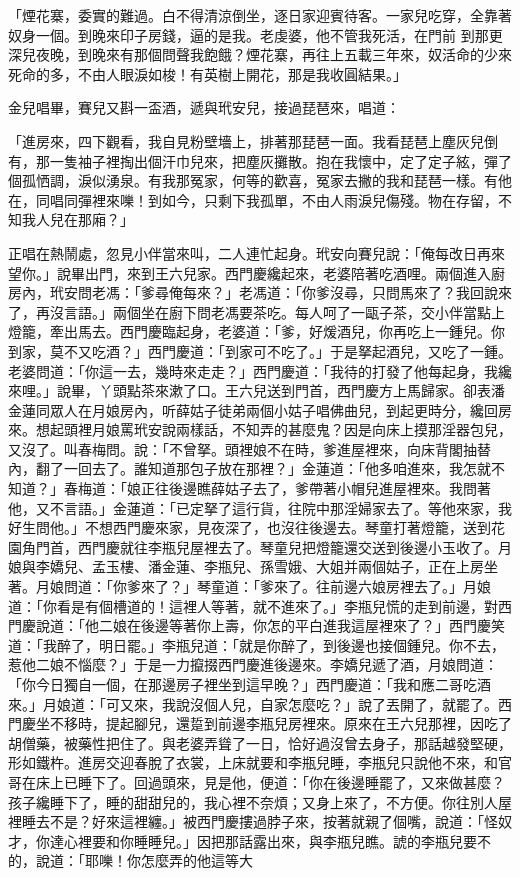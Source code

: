 \begin{showcontents}{}
「煙花寨，委實的難過。白不得清涼倒坐，逐日家迎賓待客。一家兒吃穿，全靠著奴身一個。到晚來印子房錢，逼的是我。老虔婆，他不管我死活，在門前 到那更深兒夜晚，到晚來有那個問聲我飽餓？煙花寨，再往上五載三年來，奴活命的少來死命的多，不由人眼淚如梭！有英樹上開花，那是我收圓結果。」

金兒唱畢，賽兒又斟一盃酒，遞與玳安兒，接過琵琶來，唱道：

「進房來，四下觀看，我自見粉壁墻上，排著那琵琶一面。我看琵琶上塵灰兒倒有，那一隻袖子裡掏出個汗巾兒來，把塵灰攤散。抱在我懷中，定了定子絃，彈了個孤恓調，淚似湧泉。有我那冤家，何等的歡喜，冤家去撇的我和琵琶一樣。有他在，同唱同彈裡來嚛！到如今，只剩下我孤單，不由人雨淚兒傷殘。物在存留，不知我人兒在那廂？」

正唱在熱鬧處，忽見小伴當來叫，二人連忙起身。玳安向賽兒說：「俺每改日再來望你。」說畢出門，來到王六兒家。西門慶纔起來，老婆陪著吃酒哩。兩個進入廚房內，玳安問老馮：「爹尋俺每來？」老馮道：「你爹沒尋，只問馬來了？我回說來了，再沒言語。」兩個坐在廚下問老馮要茶吃。每人呵了一甌子茶，交小伴當點上燈籠，牽出馬去。西門慶臨起身，老婆道：「爹，好煖酒兒，你再吃上一鍾兒。你到家，莫不又吃酒？」西門慶道：「到家可不吃了。」于是拏起酒兒，又吃了一鍾。老婆問道：「你這一去，幾時來走走？」西門慶道：「我待的打發了他每起身，我纔來哩。」說畢，丫頭點茶來漱了口。王六兒送到門首，西門慶方上馬歸家。卻表潘金蓮同眾人在月娘房內，听薛姑子徒弟兩個小姑子唱佛曲兒，到起更時分，纔回房來。想起頭裡月娘罵玳安說兩樣話，不知弄的甚麼鬼？因是向床上摸那淫器包兒，又沒了。叫春梅問。說：「不曾拏。頭裡娘不在時，爹進屋裡來，向床背閣抽替內，翻了一回去了。誰知道那包子放在那裡？」金蓮道：「他多咱進來，我怎就不知道？」春梅道：「娘正往後邊瞧薛姑子去了，爹帶著小帽兒進屋裡來。我問著他，又不言語。」金蓮道：「已定拏了這行貨，往院中那淫婦家去了。等他來家，我好生問他。」不想西門慶來家，見夜深了，也沒往後邊去。琴童打著燈籠，送到花園角門首，西門慶就往李瓶兒屋裡去了。琴童兒把燈籠還交送到後邊小玉收了。月娘與李嬌兒、孟玉樓、潘金蓮、李瓶兒、孫雪娥、大姐并兩個姑子，正在上房坐著。月娘問道：「你爹來了？」琴童道：「爹來了。往前邊六娘房裡去了。」月娘道：「你看是有個槽道的！這裡人等著，就不進來了。」李瓶兒慌的走到前邊，對西門慶說道：「他二娘在後邊等著你上壽，你怎的平白進我這屋裡來了？」西門慶笑道：「我醉了，明日罷。」李瓶兒道：「就是你醉了，到後邊也接個鍾兒。你不去，惹他二娘不惱麼？」于是一力攛掇西門慶進後邊來。李嬌兒遞了酒，月娘問道：「你今日獨自一個，在那邊房子裡坐到這早晚？」西門慶道：「我和應二哥吃酒來。」月娘道：「可又來，我說沒個人兒，自家怎麼吃？」說了丟開了，就罷了。西門慶坐不移時，提起腳兒，還踅到前邊李瓶兒房裡來。原來在王六兒那裡，因吃了胡僧藥，被藥性把住了。與老婆弄聳了一日，恰好過沒曾去身子，那話越發堅硬，形如鐵杵。進房交迎春脫了衣裳，上床就要和李瓶兒睡，李瓶兒只說他不來，和官哥在床上已睡下了。回過頭來，見是他，便道：「你在後邊睡罷了，又來做甚麼？孩子纔睡下了，睡的甜甜兒的，我心裡不奈煩；又身上來了，不方便。你往別人屋裡睡去不是？好來這裡纏。」被西門慶摟過脖子來，按著就親了個嘴，說道：「怪奴才，你達心裡要和你睡睡兒。」因把那話露出來，與李瓶兒瞧。諕的李瓶兒要不的，說道：「耶嚛！你怎麼弄的他這等大
\end{showcontents}
